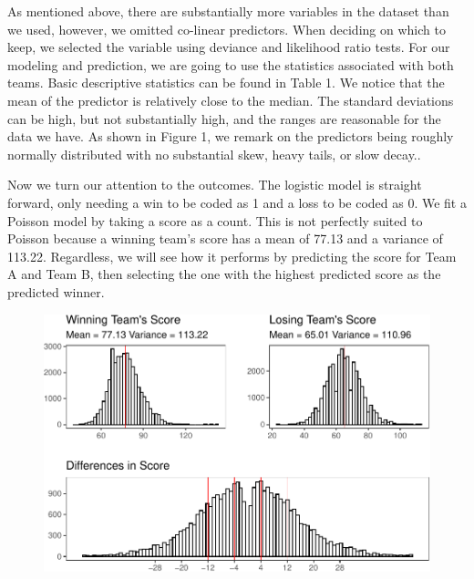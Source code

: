 \documentclass[
  man,floatsintext]{apa6}
\begin{document}
As mentioned above, there are substantially more variables in the dataset than we used, however, we omitted co-linear predictors. When deciding on which to keep, we selected the variable using deviance and likelihood ratio tests. For our modeling and prediction, we are going to use the statistics associated with both teams. Basic descriptive statistics can be found in Table 1. We notice that the mean of the predictor is relatively close to the median. The standard deviations can be high, but not substantially high, and the ranges are reasonable for the data we have. As shown in Figure 1, we remark on the predictors being roughly normally distributed with no substantial skew, heavy tails, or slow decay..

Now we turn our attention to the outcomes. The logistic model is straight forward, only needing a win to be coded as 1 and a loss to be coded as 0. We fit a Poisson model by taking a score as a count. This is not perfectly suited to Poisson because a winning team's score has a mean of 77.13 and a variance of 113.22. Regardless, we will see how it performs by predicting the score for Team A and Team B, then selecting the one with the highest predicted score as the predicted winner.

\begin{figure}

{\centering \includegraphics{paper_files/figure-latex/unnamed-chunk-3-1} 

}

\caption{ }\label{fig:unnamed-chunk-3}
\end{figure}
\end{document}

